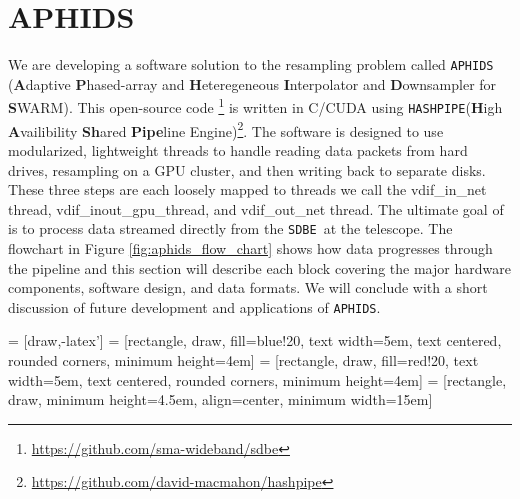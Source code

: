 \documentclass[11pt,preprint]{aastex}
\newcommand{\SDBE}{\texttt{SDBE}}
\newcommand{\APHIDS}{\texttt{APHIDS}}
\newcommand{\HASHPIPE}{\texttt{HASHPIPE}}
\begin{document}
\section{APHIDS} \label{sec:aphids}

We are developing a software solution to the resampling problem called \APHIDS\, (\textbf{A}daptive 
\textbf{P}hased-array and 
\textbf{H}eteregeneous \textbf{I}nterpolator and \textbf{D}ownsampler for \textbf{S}WARM).  This open-source 
code \footnote{\url{https://github.com/sma-wideband/sdbe}} is written in C/CUDA using
\HASHPIPE (\textbf{H}igh \textbf{A}vailibility \textbf{Sh}ared \textbf{Pipe}line
 Engine)\footnote{\url{https://github.com/david-macmahon/hashpipe}}.  The software is designed to use 
modularized, lightweight threads to handle reading data packets from hard drives, resampling on a GPU cluster, 
and then writing back to separate disks.  These three steps are each loosely mapped to threads we call the 
vdif\_in\_net thread, vdif\_inout\_gpu\_thread, and vdif\_out\_net thread. 
The ultimate goal of is to process data streamed directly from the 
\SDBE\, at the telescope.  The flowchart in Figure \ref{fig:aphids_flow_chart} shows how data progresses 
through the pipeline and this section will describe each block covering the major hardware components, software 
design, and data formats.  We will conclude with a short discussion of future development and applications of \APHIDS.

 = [draw,-latex']
 = [rectangle, draw, fill=blue!20,
    text width=5em, text centered, rounded corners, minimum height=4em]
 = [rectangle, draw, fill=red!20,
    text width=5em, text centered, rounded corners, minimum height=4em]
 = [rectangle, draw, minimum height=4.5em, align=center, minimum width=15em] 
\end{document}
